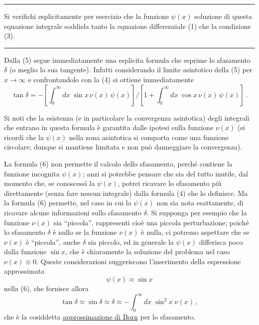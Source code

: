 \documentclass[11pt, a4paper]{book}
\numberwithin{equation}{section}
\begin{document}
\noindent\rule{\linewidth}{0.4pt}

Si verifichi esplicitamente per esercizio che la funzione $\psi(x)$ soluzione di questa equazione integrale soddisfa tanto la equazione differenziale (1) che la condizione (3).

\noindent\rule{\linewidth}{0.4pt}

Dalla (5) segue immediatamente una esplicita formula che esprime lo sfasamento $\delta$ (o meglio la sua tangente). Infatti considerando il limite asintotico della (5) per $x \to \infty$ e confrontandolo con la (4) si ottiene immediatamente
\begin{equation}
\tan\delta = -\left[\int_0^\infty dx\;\sin x\,\nu(x)\,\psi(x)\right]\Bigg/\left[1 + \int_0^\infty dx\;\cos x\,\nu(x)\,\psi(x)\right]\,. \tag{6}
\end{equation}

Si noti che la esistenza (e in particolare la convergenza asintotica) degli integrali che entrano in questa formula è garantita dalle ipotesi
sulla funzione $\nu(x)$ (si ricordi che la $\psi(x)$ nella zona asintotica si comporta come una funzione circolare; dunque si mantiene limitata e non può danneggiare la convergenza).

La formula (6) non permette il calcolo dello sfasamento, perché contiene la funzione incognita $\psi(x)$; anzi si potrebbe pensare che sia del tutto inutile, dal momento che, se conoscessì la $\psi(x)$, potrei ricavare lo sfasamento più direttamente (senza fare nessun integrale) dalla formula (4) che lo definisce. Ma la formula (6) permette, nel caso in cui la $\psi(x)$ non sia nota esattamente, di ricavare alcune informazioni sullo sfasamento $\delta$. Si supponga per esempio che la funzione $\nu(x)$ sia ``piccola'', rappresenti cioè una piccola perturbazione; poiché lo sfasamento $\delta$ è nullo se la funzione $\nu(x)$ è nulla, ci potremo aspettare che se $\nu(x)$ è ``piccola'', anche $\delta$ sia piccolo, ed in generale la $\psi(x)$ differisca poco dalla funzione $\sin x$, che è chiaramente la soluzione del problema nel caso $\nu(x) \equiv 0$. Queste considerazioni suggeriscono l'inserimento della espressione approssimata
\begin{equation}
\psi(x) \approx \sin x \tag{7}
\end{equation}
nella (6), che fornisce allora
\begin{equation}
\tan\delta \approx \sin\delta \approx \delta \approx -\int_0^{\infty} dx\;\sin^2 x\;\nu(x)\,, \tag{8}
\end{equation}
che è la cosiddetta \underline{approssimazione di Born} per lo sfasamento.
\end{document}

